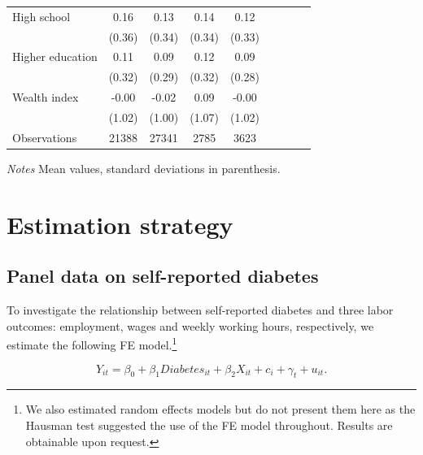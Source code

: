 \documentclass[12pt,english]{article}
\begin{document}
\begin{table}[p]
\begin{adjustbox}{max width=0.7\linewidth, center}
\begin{threeparttable}
{\begin{tabular}{l*{4}{SS}}
High school         &        0.16&        0.13&        0.14&        0.12\\
                    &      (0.36)&      (0.34)&      (0.34)&      (0.33)\\
Higher education    &        0.11&        0.09&        0.12&        0.09\\
                    &      (0.32)&      (0.29)&      (0.32)&      (0.28)\\
Wealth index        &       -0.00&       -0.02&        0.09&       -0.00\\
                    &      (1.02)&      (1.00)&      (1.07)&      (1.02)\\           
\midrule
Observations        &    21388&       27341&        2785&        3623\\
\bottomrule
\end{tabular}
\begin{tablenotes}
\item \footnotesize \textit{Notes} Mean values, standard deviations in parenthesis.
\end{tablenotes}
}
\end{threeparttable}
\end{adjustbox}
\end{table}




\section{\label{sec:Estimation Strategy}Estimation strategy}


\subsection{Panel data on self-reported diabetes}

To investigate the relationship between self-reported diabetes and three labor outcomes: employment, wages and weekly working hours, respectively, we estimate the following \acf{FE} model.\footnote{We also estimated random effects models but do not present them here as the Hausman test suggested the use of the FE model throughout. Results are obtainable upon request.}


\noindent 
\begin{equation}
Y_{it}=\beta_{0}+\beta_{1}Diabetes_{it}+\beta_{2}X_{it}+c_{i}+\gamma_{t}+u_{it}.\label{eq:cha4_employed}
\end{equation}
\end{document}

